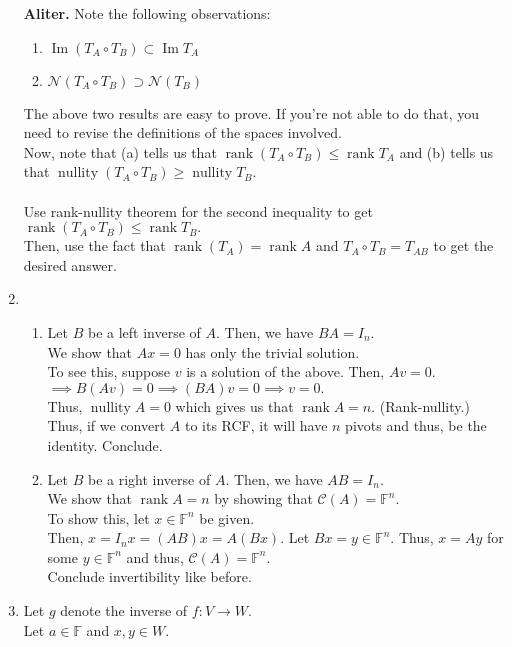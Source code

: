 \documentclass{article}
\newcommand{\rank}{\operatorname{rank}}
\renewcommand{\Im}{\operatorname{Im}}
\newcommand{\nullity}{\operatorname{nullity}}
\begin{document}
\begin{enumerate}
	\textbf{Aliter.} Note the following observations:
	\begin{enumerate}[nosep] 
		\item $\Im (T_A\circ T_B) \subset \Im T_A$
		\item $\mathcal{N}(T_A\circ T_B) \supset \mathcal{N} (T_B)$
	\end{enumerate}
	The above two results are easy to prove. If you're not able to do that, you need to revise the definitions of the spaces involved.\\
	Now, note that (a) tells us that $\rank (T_A \circ T_B) \le \rank T_A$ and (b) tells us that $\nullity(T_A\circ T_B) \ge \nullity T_B.$\\~\\
	Use rank-nullity theorem for the second inequality to get $\rank(T_A\circ T_B) \le \rank T_B.$\\
	Then, use the fact that $\rank(T_A) = \rank A$ and $T_A\circ T_B = T_{AB}$ to get the desired answer. 
	\item 
	\begin{enumerate}[label = (\roman*)] 
		\item Let $B$ be a left inverse of $A.$ Then, we have $BA = I_n.$\\
		We show that $Ax = 0$ has only the trivial solution.\\
		To see this, suppose $v$ is a solution of the above. Then, $Av = 0$.\\
		$\implies B(Av) = 0 \implies (BA)v = 0 \implies v = 0.$\\
		Thus, $\nullity A = 0$ which gives us that $\rank A = n.$ (Rank-nullity.)\\
		Thus, if we convert $A$ to its RCF, it will have $n$ pivots and thus, be the identity. Conclude.
		\item Let $B$ be a right inverse of $A.$ Then, we have $AB = I_n.$\\
		We show that $\rank A = n$ by showing that $\mathcal{C}(A) = \mathbb{F}^n.$\\
		To show this, let $x \in \mathbb{F}^n$ be given.\\
		Then, $x = I_nx = (AB)x = A(Bx).$ Let $Bx = y \in \mathbb{F}^n.$ Thus, $x = Ay$ for some $y \in \mathbb{F}^n$ and thus, $\mathcal{C}(A) = \mathbb{F}^n.$\\
		Conclude invertibility like before.
	\end{enumerate}
	\item Let $g$ denote the inverse of $f : V \to W.$\\
	Let $a \in \mathbb{F}$ and $x, y \in W.$\\

\end{enumerate}
\end{document}
